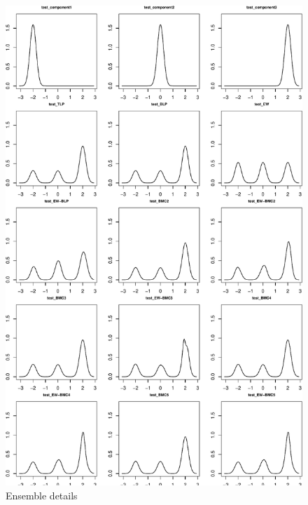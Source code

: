 \documentclass[
]{article}
\begin{document}
\begin{figure}[h]

{\centering \includegraphics{applied_blp_sim_files/figure-latex/unnamed-chunk-15-1} 

}

\caption{Ensemble details}\label{fig:unnamed-chunk-15}
\end{figure}
\clearpage
\end{document}
